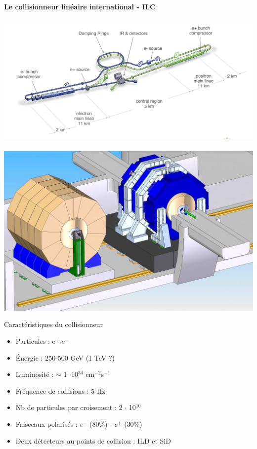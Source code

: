 \documentclass[8pt]{beamer}
\begin{document}
  \begin{frame}
  \frametitle{\secname}
  \framesubtitle{Le collisionneur linéaire international - ILC}
    \small
    \begin{center}
      \includegraphics[width=0.57\linewidth]{figs/ilc_layout.png} ~~
      \includegraphics[width=0.4\linewidth]{figs/ild_sid.jpg}
    \end{center}
    \begin{minipage}{0.51\linewidth}
      \begin{block}{Caractéristiques du collisionneur}
        \begin{itemize}
          \item Particules : e$^{+}$ e$^{-}$
          \item Énergie : 250-500 GeV (1 TeV ?)
          \item Luminosité : $\sim$ 1 $\cdot$10$^{34}$ cm$^{-2}$s$^{-1}$
          \item Fréquence de collisions : 5 Hz
          \item Nb de particules par croisement : 2 $\cdot$ 10$^{10}$
          \item Faisceaux polarisés : $e^-$ ($80\%$) - $e^+$ ($30\%$)
          \item Deux détecteurs au points de collision : ILD et SiD
        \end{itemize}
      \end{block}
    \end{minipage} \hfill
    \begin{minipage}{0.46\linewidth}
\end{minipage}
\end{frame}
\end{document}
